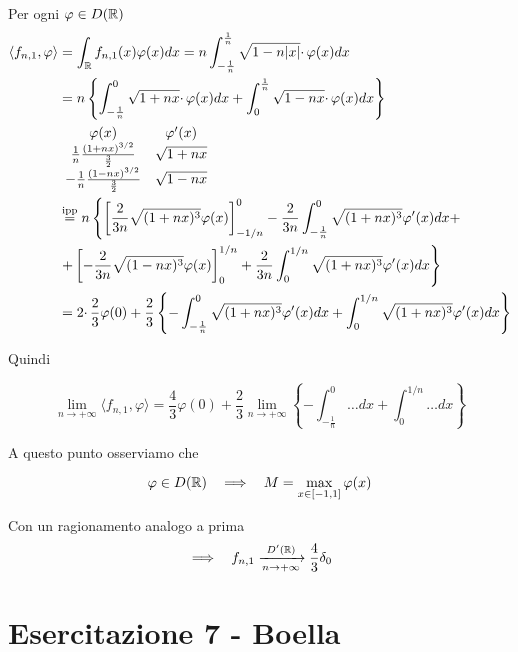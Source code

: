 \begin{enumerate}
Per ogni $\varphi \in D(\mathbb{R} )$\begin{align*}
\langle f_{n,1} ,\varphi \rangle  & =\int _{\mathbb{R} } f_{n,1}( x) \varphi ( x) dx=n\int ^{\frac{1}{n}}_{-\frac{1}{n}}\sqrt{1-n| x| } \cdotp \varphi ( x) dx\\
 & =n\left\{\int ^{0}_{-\frac{1}{n}}\sqrt{1+nx} \cdotp \varphi ( x) dx+\int ^{\frac{1}{n}}_{0}\sqrt{1-nx} \cdotp \varphi ( x) dx\right\}\\
 & \begin{array}{ c c }
\varphi ( x) & \varphi '( x)\\
\frac{1}{n}\frac{( 1+nx)^{3/2}}{\frac{3}{2}} & \sqrt{1+nx}\\
-\frac{1}{n}\frac{( 1-nx)^{3/2}}{\frac{3}{2}} & \sqrt{1-nx}
\end{array}\\
 & \overset{\text{ipp}}{=} n\left\{\left[\frac{2}{3n}\sqrt{(1+nx)^{3}} \varphi (x)\right]^{0}_{-1/n} -\frac{2}{3n}\int ^{0}_{-\frac{1}{n}}\sqrt{(1+nx)^{3}} \varphi '(x)dx+\right. \\
 & \left. +\left[ -\frac{2}{3n}\sqrt{(1-nx)^{3}} \varphi (x)\right]^{1/n}_{0} +\frac{2}{3n}\int ^{1/n}_{0}\sqrt{(1+nx)^{3}} \varphi '(x)dx\right\}\\
 & =2\cdotp \frac{2}{3} \varphi ( 0) +\frac{2}{3}\left\{-\int ^{0}_{-\frac{1}{n}}\sqrt{(1+nx)^{3}} \varphi '(x)dx+\int ^{1/n}_{0}\sqrt{(1+nx)^{3}} \varphi '(x)dx\right\}
\end{align*}

Quindi

\begin{equation*}
\lim\limits _{n\rightarrow +\infty } \langle f_{n,1} ,\varphi \rangle =\frac{4}{3} \varphi ( 0) +\frac{2}{3}\lim\limits _{n\rightarrow +\infty }\left\{-\int ^{0}_{-\frac{1}{n}} \dotsc dx+\int ^{1/n}_{0} \dotsc dx\right\}
\end{equation*}

A questo punto osserviamo che

\begin{equation*}
\varphi \in D(\RR ) \ \ \implies \ \ M=\max_{x\in [ -1,1]} \varphi ( x)
\end{equation*}

Con un ragionamento analogo a prima\begin{equation*}
\implies \ \ f_{n,1}\xrightarrow[n\rightarrow +\infty ]{D'(\mathbb{R} )}\frac{4}{3} \delta _{0}
\end{equation*}
\end{enumerate}
\chapter{Esercitazione 7 - Boella}
\ParteEsercizi
\Esercizio{}

